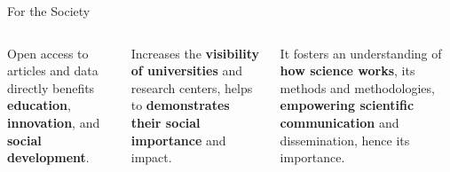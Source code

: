\documentclass[aspectratio=169]{beamer}
\begin{document}
\begin{frame}{For the Society}
  \begin{columns}[T,onlytextwidth]
      \begin{cookiecard}[title=Access to Knowledge]
        Open access to articles and data directly benefits \textbf{education}, \textbf{innovation}, and \textbf{social development}.
      \end{cookiecard}
      
      \vspace{1em}
      \begin{cookiecard}[title=Institutional Transparency]
        Increases the \textbf{visibility of universities} and research centers, helps to \textbf{demonstrates their social importance} and impact.
      \end{cookiecard}

      \vspace{1em}
      \vspace{.5em}
      
      It fosters an understanding of \textbf{how science works}, its methods and methodologies, \textbf{empowering scientific communication} and dissemination, hence its importance.
      
      \vspace{1em}
      \centering
  \end{columns}
\end{frame}
\end{document}
